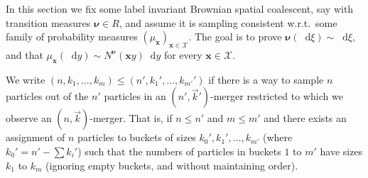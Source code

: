 \documentclass[reqno,draft]{amsart}
\numberwithin{equation}{section}
\theoremstyle{plain}
\theoremstyle{remark}
\newcommand*\diff{\mathop{}\!\mathrm{d}}
\newcommand{\nurates}{R} %
\begin{document}
In this section we fix some label invariant Brownian spatial coalescent, say with transition measures $\boldsymbol \nu \in \nurates$, and assume it is sampling consistent w.r.t.\ some family of probability measures $(\mu_{\boldsymbol x})_{\boldsymbol x\in \mathcal{X}}$. The goal is to prove $\boldsymbol \nu(\diff \xi) \sim \diff \xi$, and that $\mu_{\boldsymbol x}(\diff y) \sim N^{\boldsymbol\nu}(\boldsymbol xy) \diff y$ for every $\boldsymbol x\in \mathcal{X}$.

We write $(n,k_1, \ldots ,k_m) \le (n',k_1', \ldots ,k_{m'}')$ if there is a way to sample $n$ particles out of the $n'$ particles in an $(n',\vec{k}')$-merger restricted to which we observe an $(n,\vec{k})$-merger. That is, if $n \le n'$ and $m \le m'$ and there exists an assignment of $n$ particles to buckets of sizes $k_0',k_1', \ldots ,k_{m'}$ (where $k_0'=n' - \sum k_i'$) such that the numbers of particles in buckets $1$ to $m'$ have sizes $k_1$ to $k_m$ (ignoring empty buckets, and without maintaining order).
\end{document}
